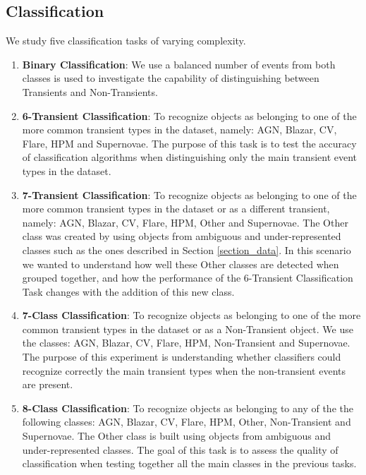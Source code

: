 \documentclass[a4paper,fleqn,usenatbib]{mnras}
\begin{document}
\subsection{Classification} \label{subsection_classification}

We study five classification tasks of varying complexity.

\begin{enumerate}
    \item \textbf{Binary Classification}: 
      We use a balanced number of events from both classes is used 
      to investigate the capability of distinguishing between Transients
      and Non-Transients.
    \item \textbf{6-Transient Classification}: To recognize objects as
      belonging to one of the more common transient types in the dataset,
      namely: AGN, Blazar, CV, Flare, HPM and Supernovae. The purpose of
      this task is to test the accuracy of classification algorithms
      when distinguishing only the main transient event types in the
      dataset. 
    \item \textbf{7-Transient Classification}: To recognize objects as
      belonging to one of the more common transient types in the dataset
      or as a different transient, namely: AGN, Blazar, CV, Flare, HPM,
      Other and Supernovae. The Other class was created by using objects
      from ambiguous and under-represented classes such as the ones
      described in Section \ref{section_data}. In this scenario we wanted
      to understand how well these Other classes are detected when
      grouped together, and how the performance of the 6-Transient
      Classification Task changes with the addition of this new class. 
    \item \textbf{7-Class Classification}: To recognize objects as
      belonging to one of the more common transient types in the
      dataset or as a Non-Transient object. We use the classes:
      AGN, Blazar, CV, Flare, HPM, Non-Transient and Supernovae. 
      The purpose of this experiment is understanding whether classifiers 
      could recognize correctly the main transient types when the 
      non-transient events are present.  
    \item \textbf{8-Class Classification}: To recognize objects as
      belonging to any of the the following classes: AGN, Blazar, CV,
      Flare, HPM, Other, Non-Transient and Supernovae. 
      The Other class is built using objects from ambiguous and
      under-represented classes. 
      The goal of this task is to assess the quality of classification when
      testing together all the main classes in the previous tasks.
\end{enumerate}
\end{document}
